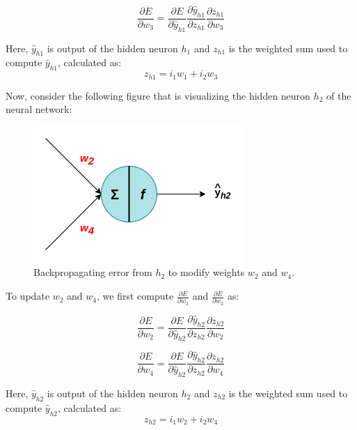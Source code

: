 \begin{equation}
    \frac{\partial E}{\partial w_3} = \frac{\partial E}{\partial \hat{y}_{h1}} \frac{\partial \hat{y}_{h1}}{\partial z_{h1}} \frac{\partial z_{h1}}{\partial w_3}
\end{equation}

Here, $\hat{y}_{h1}$ is output of the hidden neuron $h_1$ and $z_{h1}$ is the weighted sum used to compute $\hat{y}_{h1}$, calculated as:
\begin{equation}
    z_{h1} = i_1 w_1 + i_2 w_3
\end{equation}

Now, consider the following figure that is visualizing the hidden neuron $h_2$ of the neural network:
\begin{figure}[h]
	\centering
	\includegraphics[width=0.4\linewidth]{images/background/back_prop_3.png}
	\caption[Backpropagating error from $h_2$]%
	{Backpropagating error from $h_2$ to modify weights $w_2$ and $w_4$.}
	\label{fig:back_prop_3}
\end{figure}

To update $w_2$ and $w_4$, we first compute $\frac{\partial E}{\partial w_2}$ and $\frac{\partial E}{\partial w_2}$ as:

\begin{equation}
    \frac{\partial E}{\partial w_2} = \frac{\partial E}{\partial \hat{y}_{h2}} \frac{\partial \hat{y}_{h2}}{\partial z_{h2}} \frac{\partial z_{h2}}{\partial w_2}
\end{equation}

\begin{equation}
    \frac{\partial E}{\partial w_4} = \frac{\partial E}{\partial \hat{y}_{h2}} \frac{\partial \hat{y}_{h2}}{\partial z_{h2}} \frac{\partial z_{h2}}{\partial w_4}
\end{equation}

Here, $\hat{y}_{h2}$ is output of the hidden neuron $h_2$ and $z_{h2}$ is the weighted sum used to compute $\hat{y}_{h2}$, calculated as:
\begin{equation}
    z_{h2} = i_1 w_2 + i_2 w_4
\end{equation}

